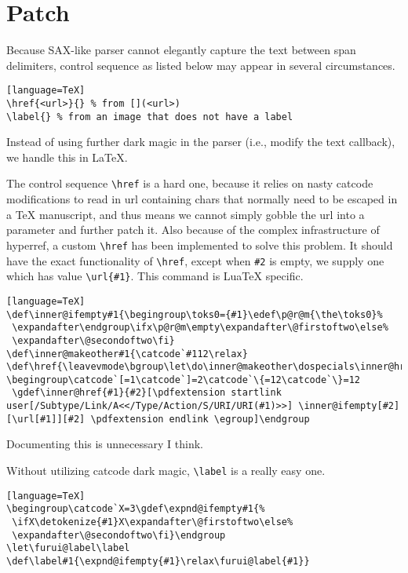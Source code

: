\section{Patch}
Because SAX-like parser cannot elegantly capture the text between span delimiters, control sequence as listed below may appear in several circumstances.\par
\begin{verbatim}[language=TeX]
\href{<url>}{} % from [](<url>)
\label{} % from an image that does not have a label
\end{verbatim}
Instead of using further dark magic in the parser (i.e., modify the text callback), we handle this in LaTeX.\par
The control sequence \verb!\href! is a hard one, because it relies on nasty catcode modifications to read in url containing chars that normally need to be escaped in a TeX manuscript, and thus means we cannot simply gobble the url into a parameter and further patch it.
Also because of the complex infrastructure of hyperref, a custom \verb!\href! has been implemented to solve this problem. It should have the exact functionality of \verb!\href!, except when \verb!#2! is empty, we supply one which has value \verb!\url{#1}!.
This command is LuaTeX specific.\par
\begin{verbatim}[language=TeX]
\def\inner@ifempty#1{\begingroup\toks0={#1}\edef\p@r@m{\the\toks0}%
 \expandafter\endgroup\ifx\p@r@m\empty\expandafter\@firstoftwo\else%
 \expandafter\@secondoftwo\fi}
\def\inner@makeother#1{\catcode`#112\relax}
\def\href{\leavevmode\bgroup\let\do\inner@makeother\dospecials\inner@href}
\begingroup\catcode`[=1\catcode`]=2\catcode`\{=12\catcode`\}=12
 \gdef\inner@href{#1}{#2}[\pdfextension startlink user[/Subtype/Link/A<</Type/Action/S/URI/URI(#1)>>] \inner@ifempty[#2][\url[#1]][#2] \pdfextension endlink \egroup]\endgroup
\end{verbatim}
Documenting this is unnecessary I think.\par
Without utilizing catcode dark magic, \verb!\label! is a really easy one.\par
\begin{verbatim}[language=TeX]
\begingroup\catcode`X=3\gdef\expnd@ifempty#1{%
 \ifX\detokenize{#1}X\expandafter\@firstoftwo\else%
 \expandafter\@secondoftwo\fi}\endgroup
\let\furui@label\label
\def\label#1{\expnd@ifempty{#1}\relax\furui@label{#1}}
\end{verbatim}

